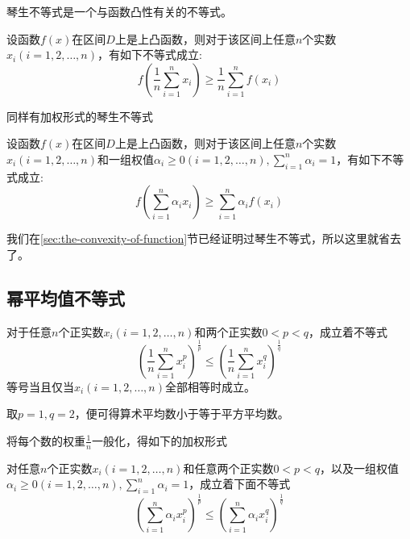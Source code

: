 琴生不等式是一个与函数凸性有关的不等式。
\begin{theorem}[琴生不等式]
  设函数$f(x)$在区间$D$上是上凸函数，则对于该区间上任意$n$个实数$x_i(i=1,2,\ldots,n)$，有如下不等式成立:
  \begin{equation}
    \label{eq:jenson-inequality-some-import-inequality}
    f \left( \frac{1}{n} \sum_{i=1}^nx_i \right) \geqslant
    \frac{1}{n} \sum_{i=1}^n f(x_i)
  \end{equation}
\end{theorem}

同样有加权形式的琴生不等式
\begin{theorem}[加权形式的琴生不等式]
  设函数$f(x)$在区间$D$上是上凸函数，则对于该区间上任意$n$个实数$x_i(i=1,2,\ldots,n)$和一组权值$\alpha_i\geqslant 0(i=1,2,\ldots,n), \sum_{i=1}^n\alpha_i=1$，有如下不等式成立:
  \begin{equation}
    \label{eq:jenson-inequality-with-weight}
    f \left( \sum_{i=1}^n\alpha_ix_i \right) \geqslant
    \sum_{i=1}^n \alpha_if(x_i)
  \end{equation}
\end{theorem}

我们在\ref{sec:the-convexity-of-function}节已经证明过琴生不等式，所以这里就省去了。

\subsection{幂平均值不等式}

\begin{theorem}[幂平均值不等式]
  对于任意$n$个正实数$x_i(i=1,2,\ldots,n)$和两个正实数$0<p<q$，成立着不等式
  \begin{equation}
    \label{eq:pow-mean-inequation}
    \left( \frac{1}{n}\sum_{i=1}^nx_i^{p} \right)^{\frac{1}{p}}
    \leqslant \left( \frac{1}{n}\sum_{i=1}^nx_i^{q} \right)^{\frac{1}{q}}
  \end{equation}
  等号当且仅当$x_i(i=1,2,\ldots,n)$全部相等时成立。
\end{theorem}
取$p=1,q=2$，便可得算术平均数小于等于平方平均数。

将每个数的权重$\frac{1}{n}$一般化，得如下的加权形式
\begin{theorem}[加权幂平均值不等式]
  对任意$n$个正实数$x_i(i=1,2,\ldots,n)$和任意两个正实数$0<p<q$，以及一组权值$\alpha_i \geqslant 0(i=1,2,\ldots,n), \sum_{i=1}^n\alpha_i=1$，成立着下面不等式
  \begin{equation}
    \label{eq:pow-mean-inequation-with-weight}
    \left( \sum_{i=1}^n\alpha_ix_i^p \right)^{\frac{1}{p}}
    \leqslant \left( \sum_{i=1}^n\alpha_ix_i^q \right)^{\frac{1}{q}}
  \end{equation}
\end{theorem}

